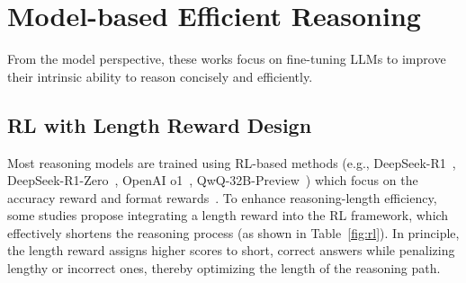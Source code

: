 \section{Model-based Efficient Reasoning}

From the model perspective, these works focus on fine-tuning LLMs to improve their intrinsic ability to reason concisely and efficiently.

\subsection{RL with Length Reward Design}
\label{sec:rl}

Most reasoning models are trained using RL-based methods (e.g., DeepSeek-R1~\cite{guo2025deepseek}, DeepSeek-R1-Zero~\cite{guo2025deepseek}, OpenAI o1~\cite{openai_learning_to_reason}, QwQ-32B-Preview~\cite{qwen_qwq_32b_preview}) which focus on the accuracy reward and format rewards~\cite{guo2025deepseek}. To enhance reasoning-length efficiency, some studies propose integrating a length reward into the RL framework, which effectively shortens the reasoning process (as shown in Table~\ref{fig:rl}). In principle, the length reward assigns higher scores to short, correct answers while penalizing lengthy or incorrect ones, thereby optimizing the length of the reasoning path.

